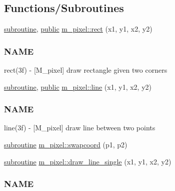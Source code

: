 \subsection*{Functions/\+Subroutines}
\begin{DoxyCompactItemize}
\item 
\hyperlink{M__stopwatch_83_8txt_acfbcff50169d691ff02d4a123ed70482}{subroutine}, \hyperlink{M__stopwatch_83_8txt_a2f74811300c361e53b430611a7d1769f}{public} \hyperlink{namespacem__pixel_a5435aa0d9d6048a62c09d7d90665b958}{m\+\_\+pixel\+::rect} (x1, y1, x2, y2)
\begin{DoxyCompactList}\small\item\em \subsubsection*{N\+A\+ME}

rect(3f) -\/ \mbox{[}M\+\_\+pixel\mbox{]} draw rectangle given two corners \end{DoxyCompactList}\item 
\hyperlink{M__stopwatch_83_8txt_acfbcff50169d691ff02d4a123ed70482}{subroutine}, \hyperlink{M__stopwatch_83_8txt_a2f74811300c361e53b430611a7d1769f}{public} \hyperlink{namespacem__pixel_a491951b89e60d0d40d67f22d987da894}{m\+\_\+pixel\+::line} (x1, y1, x2, y2)
\begin{DoxyCompactList}\small\item\em \subsubsection*{N\+A\+ME}

line(3f) -\/ \mbox{[}M\+\_\+pixel\mbox{]} draw line between two points \end{DoxyCompactList}\item 
\hyperlink{M__stopwatch_83_8txt_acfbcff50169d691ff02d4a123ed70482}{subroutine} \hyperlink{namespacem__pixel_a063f74c3dd2f7f086dc47ec68abc22c9}{m\+\_\+pixel\+::swapcoord} (p1, p2)
\item 
\hyperlink{M__stopwatch_83_8txt_acfbcff50169d691ff02d4a123ed70482}{subroutine} \hyperlink{namespacem__pixel_a42791c7e58158616dae7c36ec5806717}{m\+\_\+pixel\+::draw\+\_\+line\+\_\+single} (x1, y1, x2, y2)
\begin{DoxyCompactList}\small\item\em \subsubsection*{N\+A\+ME}


\end{DoxyCompactList}
\end{DoxyCompactItemize}
